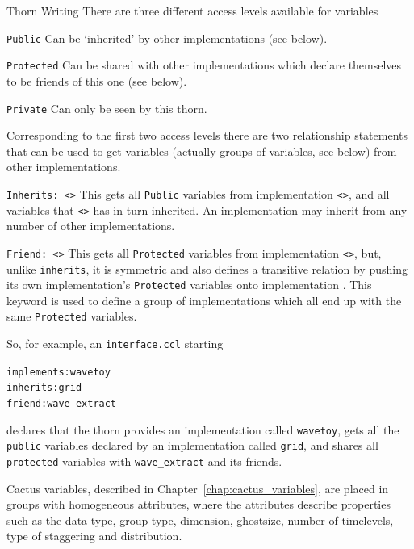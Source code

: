 \begin{cactuspart}{Thorn Writing}
There are three different access levels available for variables

\begin{Lentry}
\item[\texttt{Public}]
Can be `inherited' by other implementations (see below).
\item[\texttt{Protected}]
Can be shared with other implementations which declare themselves to
be friends of this one (see below).
\item[\texttt{Private}]
Can only be seen by this thorn.
\end{Lentry}

Corresponding to the first two access levels there are two relationship
statements that can be used to get variables (actually groups of variables,
see below) from other implementations.

\begin{Lentry}
\item [\texttt{Inherits: <\var{name}>}]
This gets all \texttt{Public} variables from implementation \texttt{<>}, and all
variables that \texttt{<>} has in turn inherited.
An implementation may inherit from any number of other implementations.
\item [\texttt{Friend: <\var{name}>}]
This gets all \texttt{Protected} variables from implementation \texttt{<>}, but,
unlike \texttt{inherits}, it is symmetric and also defines a transitive relation by
pushing its own implementation's \texttt{Protected} variables onto implementation
.  This keyword is used to define a group of implementations which
all end up with the same \texttt{Protected} variables.
\end{Lentry}

So, for example, an \texttt{interface.ccl} starting
\begin{alltt}
implements: wavetoy
inherits:   grid
friend:     wave_extract
\end{alltt}
declares that the thorn provides an implementation called \texttt{wavetoy}, gets
all the \texttt{public} variables declared by an implementation called \texttt{grid},
and shares all \texttt{protected} variables with \texttt{wave\_extract} and its
friends.

Cactus variables, described in Chapter~\ref{chap:cactus_variables}, are placed
in groups with homogeneous attributes, where
the attributes describe properties such as the data type, group type,
dimension, ghostsize, number of timelevels, type of staggering and
distribution.


\end{cactuspart}
